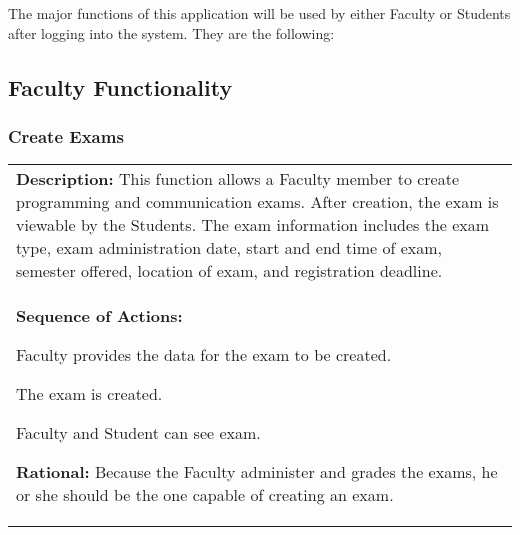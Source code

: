 
\newenvironment{boxed}
 {\begin{center} \begin{tabular}{|p{0.9\textwidth}|}
 \hline
 }
 { 
 \\\hline
 \end{tabular} 
 \end{center}
 }

The major functions of this application will be used by either Faculty or Students
after logging into the system. They are the following:

\subsection{Faculty Functionality}

   \subsubsection{\large Create Exams} 
   \begin{boxed} %
      \textbf{Description:}
      {\small This function allows a Faculty member to create programming and
         communication exams. After creation, the exam is viewable by the
         Students. The exam information includes the exam type, exam
         administration date, start and end time of exam, semester offered,
         location of exam, and registration deadline.} \\

      \textbf{Sequence of Actions:}
      \begin{enumerate}
            {\small
         \item Faculty provides the data for the exam to be created.
         \item The exam is created.
         \item Faculty and Student can see exam.}
      \end{enumerate}

      \textbf{Rational:}
      {\small Because the Faculty administer and grades the exams, he or she should
      be the one capable of creating an exam.}
   \end{boxed} %

